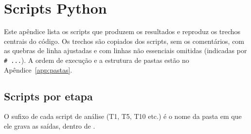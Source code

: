 \chapter{Scripts Python}
\label{app:scripts}

Este apêndice lista os scripts que produzem os resultados e
reproduz os trechos centrais do código. Os trechos são copiados dos scripts,
sem os comentários, com as quebras de linha ajustadas e com linhas não
essenciais omitidas (indicadas por \texttt{\# ...}). A ordem de
execução e a estrutura de pastas estão no Apêndice~\ref{app:pastas}.

\section{Scripts por etapa}

O sufixo de cada script de análise (T1, T5, T10 etc.) é o nome da pasta em que
ele grava as saídas, dentro de .

